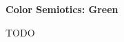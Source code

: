 \documentclass[12pt]{article}
\begin{document}
\vspace*{20pt}
\begin{center}
        \textbf{Color Semiotics: Green}
\end{center}
    \begin{doublespace}

    \end{doublespace}

\newpage
TODO %
\end{document}
